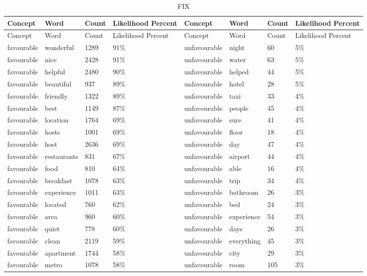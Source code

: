 \documentclass[a4paper, 12pt]{article}
\begin{document}
\footnotesize
\begin{longtable}{p{2cm}p{2cm}p{1cm}p{1.6cm}p{2.4cm}p{1.9cm}p{1cm}p{2cm}}
\caption{FIX} \\
Concept & Word & Count & Likelihood Percent & Concept & Word & Count & Likelihood Percent \\
\midrule
\endfirsthead
Concept & Word & Count & Likelihood Percent & Concept & Word & Count & Likelihood Percent \\
\midrule
\endhead
\endfoot
\endlastfoot

favourable & wonderful & 1289 & 91\% & unfavourable & night & 60 & 5\% \\
favourable & nice & 2428 & 91\% & unfavourable & water & 63 & 5\% \\
favourable & helpful & 2480 & 90\% & unfavourable & helped & 44 & 5\% \\
favourable & beautiful & 937 & 89\% & unfavourable & hotel & 28 & 5\% \\
favourable & friendly & 1322 & 89\% & unfavourable & taxi & 33 & 4\% \\
favourable & best & 1149 & 87\% & unfavourable & people & 45 & 4\% \\
favourable & location & 1764 & 69\% & unfavourable & sure & 41 & 4\% \\
favourable & hosts & 1001 & 69\% & unfavourable & floor & 18 & 4\% \\
favourable & host & 2636 & 69\% & unfavourable & day & 47 & 4\% \\
favourable & restaurants & 831 & 67\% & unfavourable & airport & 44 & 4\% \\
favourable & food & 810 & 64\% & unfavourable & able & 16 & 4\% \\
favourable & breakfast & 1078 & 63\% & unfavourable & trip & 34 & 4\% \\
favourable & experience & 1011 & 63\% & unfavourable & bathroom & 26 & 3\% \\
favourable & located & 760 & 62\% & unfavourable & bed & 24 & 3\% \\
favourable & area & 960 & 60\% & unfavourable & experience & 54 & 3\% \\
favourable & quiet & 778 & 60\% & unfavourable & days & 26 & 3\% \\
favourable & clean & 2119 & 59\% & unfavourable & everything & 45 & 3\% \\
favourable & apartment & 1744 & 58\% & unfavourable & city & 29 & 3\% \\
favourable & metro & 1078 & 58\% & unfavourable & room & 105 & 3\% \\

\end{longtable}
\end{document}
